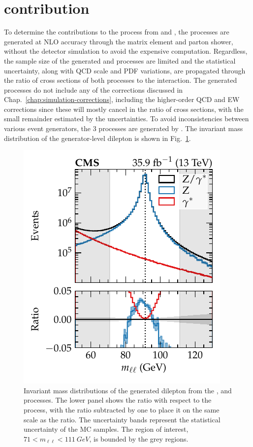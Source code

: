 \section{\Pgstar contribution}

To determine the contributions to the \IDYll process from \IZll and \Igstarll, the processes are generated at NLO accuracy through the matrix element and parton shower, without the detector simulation to avoid the expensive computation. Regardless, the sample size of the generated \IZll and \Igstarll processes are limited and the statistical uncertainty, along with QCD scale and PDF variations, are propagated through the ratio of cross sections of both processes to the \IDYll interaction. The generated processes do not include any of the corrections discussed in Chap.~\ref{chap:simulation-corrections}, including the higher-order QCD and EW corrections since these will mostly cancel in the ratio of cross sections, with the small remainder estimated by the uncertainties. To avoid inconsistencies between various event generators, the 3 processes are generated by \MADGRAPH. The invariant mass distribution of the generator-level dilepton is shown in Fig.~\ref{fig:gstar_invmass}.
%
\begin{figure}
    \centering
    \includegraphics{chapters/042_backgrounds/images/gstar_invmass.pdf}
    \caption[Invariant mass distributions of the \IDYll, \IZll and \Igstarll processes.]{
        Invariant mass distributions of the generated dilepton from the \IDYll, \IZll and \Igstarll processes. The lower panel shows the ratio with respect to the \IDYll process, with the \IZll ratio subtracted by one to place it on the same scale as the \Igstarll ratio. The uncertainty bands represent the statistical uncertainty of the MC samples. The region of interest, ${71<m_{\ell\ell}<\SI{111}{GeV}}$, is bounded by the grey regions.
    }
    \label{fig:gstar_invmass}
\end{figure}
